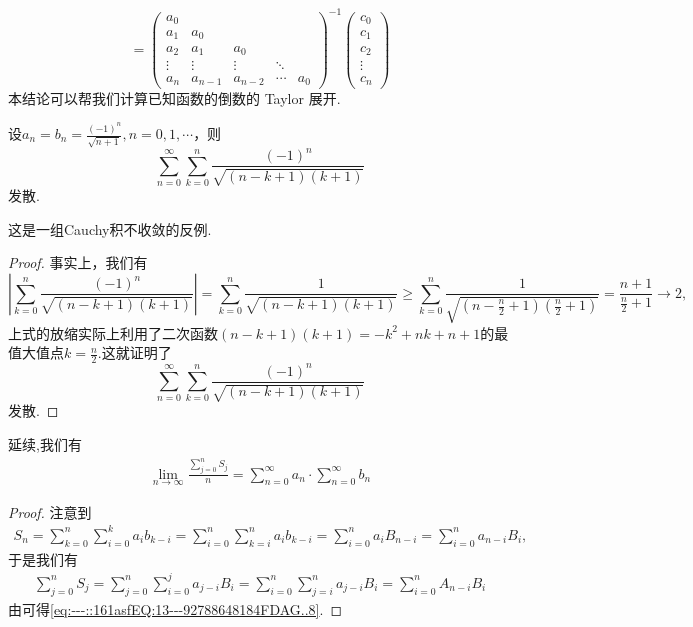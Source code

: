 \documentclass[../../main.tex]{subfiles}
\begin{document}
\begin{conclusion}
\[=
\begin{pmatrix}
a_0 \\
a_1 & a_0 \\
a_2 & a_1 & a_0 \\
\vdots & \vdots & \vdots & \ddots \\
a_n & a_{n-1} & a_{n-2} & \cdots & a_0
\end{pmatrix}^{-1}
\begin{pmatrix}
c_0 \\
c_1 \\
c_2 \\
\vdots \\
c_n
\end{pmatrix}
\]
本结论可以帮我们计算已知函数的倒数的 Taylor 展开.
\end{conclusion}


\begin{example}
设\(a_n = b_n = \frac{(-1)^n}{\sqrt{n + 1}}, n = 0,1,\cdots\)，则
\[
\sum_{n = 0}^{\infty} \sum_{k = 0}^{n} \frac{(-1)^n}{\sqrt{(n - k + 1)(k + 1)}}
\]
发散.
\end{example}
\begin{remark}
这是一组Cauchy积不收敛的反例.
\end{remark}
\begin{proof}
事实上，我们有
\[
\left| \sum_{k = 0}^{n} \frac{(-1)^n}{\sqrt{(n - k + 1)(k + 1)}} \right| = \sum_{k = 0}^{n} \frac{1}{\sqrt{(n - k + 1)(k + 1)}} \geqslant \sum_{k = 0}^{n} \frac{1}{\sqrt{\left(n - \frac{n}{2} + 1\right)\left(\frac{n}{2} + 1\right)}} = \frac{n + 1}{\frac{n}{2} + 1} \to 2,
\]
上式的放缩实际上利用了二次函数$\left( n-k+1 \right) \left( k+1 \right) =-k^2+nk+n+1$的最值大值点$k=\frac{n}{2}$.这就证明了
\[
\sum_{n = 0}^{\infty} \sum_{k = 0}^{n} \frac{(-1)^n}{\sqrt{(n - k + 1)(k + 1)}}
\]
发散.

\end{proof}

\begin{proposition}\label{proposition:命题3....4}
延续,我们有
\begin{align}
\lim\limits_{n\to\infty} \frac{\sum\limits_{j=0}^{n} S_j}{n} = \sum\limits_{n=0}^{\infty} a_n \cdot \sum\limits_{n=0}^{\infty} b_n
\label{eq:---::161asfEQ:13---92788648184FDAG..8}
\end{align}
\end{proposition}
\begin{proof}
注意到
\begin{align*}
S_n = \sum\limits_{k=0}^{n} \sum\limits_{i=0}^{k} a_i b_{k-i} = \sum\limits_{i=0}^{n} \sum\limits_{k=i}^{n} a_i b_{k-i} = \sum\limits_{i=0}^{n} a_i B_{n-i} = \sum\limits_{i=0}^{n} a_{n-i} B_i,
\end{align*}
于是我们有
\begin{align*}
\sum\limits_{j=0}^{n} S_j = \sum\limits_{j=0}^{n} \sum\limits_{i=0}^{j} a_{j-i} B_i = \sum\limits_{i=0}^{n} \sum\limits_{j=i}^{n} a_{j-i} B_i = \sum\limits_{i=0}^{n} A_{n-i} B_i
\end{align*}
由可得\eqref{eq:---::161asfEQ:13---92788648184FDAG..8}.

\end{proof}
\end{document}
